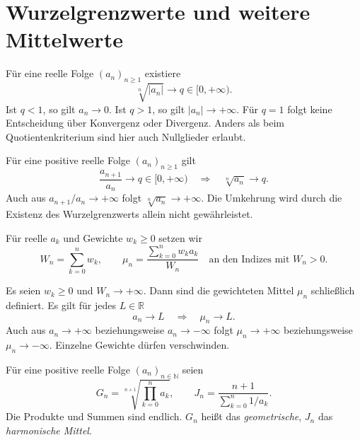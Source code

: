 \section{Wurzelgrenzwerte und weitere Mittelwerte}

\begin{theorem}
\label{b21guide:thm:root-test}
Für eine reelle Folge $(a_n)_{n\geq1}$ existiere
\[
 \sqrt[n]{|a_n|}\longrightarrow q\in[0,+\infty).
\]
Ist $q<1$, so gilt $a_n\to0$.
Ist $q>1$, so gilt $|a_n|\to+\infty$.
Für $q=1$ folgt keine Entscheidung über Konvergenz oder Divergenz.
Anders als beim Quotientenkriterium sind hier auch Nullglieder erlaubt.
\end{theorem}

\begin{theorem}
\label{b21guide:thm:ratio-root}
Für eine positive reelle Folge $(a_n)_{n\geq1}$ gilt
\[
 \frac{a_{n+1}}{a_n}\longrightarrow q\in[0,+\infty)
 \quad\Longrightarrow\quad
 \sqrt[n]{a_n}\longrightarrow q.
\]
Auch aus $a_{n+1}/a_n\to+\infty$ folgt
$\sqrt[n]{a_n}\to+\infty$.
Die Umkehrung wird durch die Existenz des Wurzelgrenzwerts
allein nicht gewährleistet.
\end{theorem}

\begin{definition}
\label{b21guide:def:weighted-means}
Für reelle $a_k$ und Gewichte $w_k\geq0$ setzen wir
\[
 W_n=\sum_{k=0}^{n}w_k,\qquad
 \mu_n=\frac{\sum_{k=0}^{n}w_ka_k}{W_n}
 \quad\text{an den Indizes mit }W_n>0.
\]
\end{definition}

\begin{theorem}
\label{b21guide:thm:weighted-cesaro}
Es seien $w_k\geq0$ und $W_n\to+\infty$.
Dann sind die gewichteten Mittel $\mu_n$ schließlich definiert.
Es gilt für jedes $L\in\mathbb R$
\[
 a_n\to L\quad\Longrightarrow\quad\mu_n\to L.
\]
Auch aus $a_n\to+\infty$ beziehungsweise $a_n\to-\infty$
folgt $\mu_n\to+\infty$ beziehungsweise $\mu_n\to-\infty$.
Einzelne Gewichte dürfen verschwinden.
\end{theorem}

\begin{definition}
\label{b21guide:def:geometric-harmonic}
Für eine positive reelle Folge $(a_n)_{n\in\mathbb N}$ seien
\[
 G_n=\sqrt[n+1]{\prod_{k=0}^{n}a_k},
 \qquad
 J_n=\frac{n+1}{\sum_{k=0}^{n}1/a_k}.
\]
Die Produkte und Summen sind endlich. $G_n$ heißt das
\emph{geometrische}, $J_n$ das \emph{harmonische Mittel}.
\end{definition}

